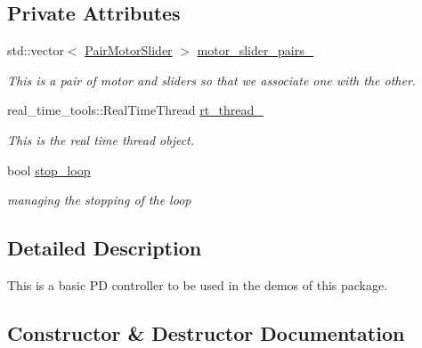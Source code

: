 \subsection*{Private Attributes}
\begin{DoxyCompactItemize}
\item 
\mbox{\label{classblmc__drivers_1_1PDController_a11b0e1df638bc792b752349f39187a67}} 
std\+::vector$<$ \hyperlink{namespaceblmc__drivers_a134270c90d29a9a28b64ab0e5f7158f7}{Pair\+Motor\+Slider} $>$ \hyperlink{classblmc__drivers_1_1PDController_a11b0e1df638bc792b752349f39187a67}{motor\+\_\+slider\+\_\+pairs\+\_\+}
\begin{DoxyCompactList}\small\item\em This is a pair of motor and sliders so that we associate one with the other. \end{DoxyCompactList}\item 
\mbox{\label{classblmc__drivers_1_1PDController_a425d7f9c093a0c586ef608d4c11c8889}} 
real\+\_\+time\+\_\+tools\+::\+Real\+Time\+Thread \hyperlink{classblmc__drivers_1_1PDController_a425d7f9c093a0c586ef608d4c11c8889}{rt\+\_\+thread\+\_\+}
\begin{DoxyCompactList}\small\item\em This is the real time thread object. \end{DoxyCompactList}\item 
\mbox{\label{classblmc__drivers_1_1PDController_a3520dd968bde954399bf3ef4508c3d54}} 
bool \hyperlink{classblmc__drivers_1_1PDController_a3520dd968bde954399bf3ef4508c3d54}{stop\+\_\+loop}
\begin{DoxyCompactList}\small\item\em managing the stopping of the loop \end{DoxyCompactList}\end{DoxyCompactItemize}


\subsection{Detailed Description}
This is a basic PD controller to be used in the demos of this package. 

\subsection{Constructor \& Destructor Documentation}
\mbox{\label{classblmc__drivers_1_1PDController_a78e3d01f6bcc263b20b81a7525d072cf}} 
